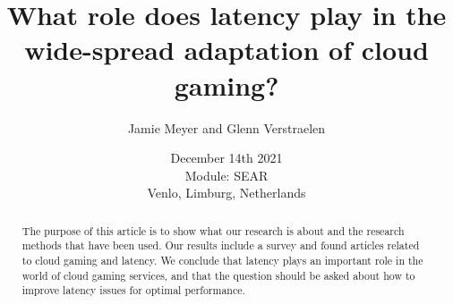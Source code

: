 \documentclass[]{report}
\title{What role does latency play in the wide-spread adaptation of cloud gaming?}
\author{Jamie Meyer and Glenn Verstraelen}
\date{December 14th 2021 \\Module: SEAR \\Venlo, Limburg, Netherlands}
\begin{document}
\maketitle

\begin{abstract}
The purpose of this article is to show what our research is about and the research methods that have been used. Our results include a survey and found articles related to cloud gaming and latency. We conclude that latency plays an important role in the world of cloud gaming services, and that the question should be asked about how to improve latency issues for optimal performance. 
\end{abstract}

\tableofcontents
\setcounter{page}{3}
{%
	\let\oldnumberline\numberline%
	\renewcommand{\numberline}{\figurename~\oldnumberline}%
	\listoffigures%
}
\pagebreak
{}	
	
 
 
 
 

\printbibliography[title=References]



\appendix

\end{document}
